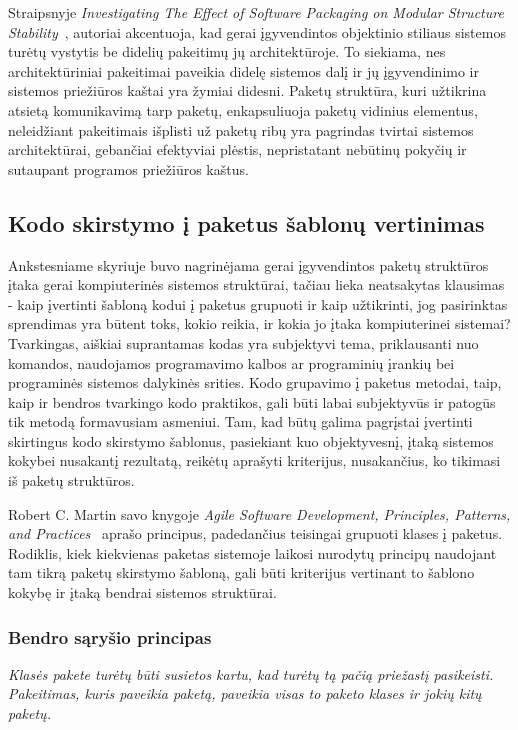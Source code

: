 Straipsnyje \textit{Investigating The Effect of Software Packaging on Modular Structure Stability}~\cite{ModularStability}, autoriai akcentuoja, kad
gerai įgyvendintos objektinio stiliaus sistemos turėtų vystytis be didelių pakeitimų jų architektūroje.
To siekiama, nes architektūriniai pakeitimai paveikia didelę sistemos dalį ir
jų įgyvendinimo ir sistemos priežiūros kaštai yra žymiai didesni\cite{ModularStability}.
Paketų struktūra, kuri užtikrina atsietą  komunikavimą tarp paketų, enkapsuliuoja paketų vidinius elementus, neleidžiant pakeitimais
išplisti už paketų ribų yra pagrindas tvirtai sistemos architektūrai, gebančiai efektyviai plėstis, nepristatant nebūtinų pokyčių ir sutaupant programos priežiūros kaštus.

\subsection{Kodo skirstymo į paketus šablonų vertinimas}
Ankstesniame skyriuje buvo nagrinėjama gerai įgyvendintos paketų struktūros įtaka gerai kompiuterinės sistemos struktūrai,
tačiau lieka neatsakytas klausimas - kaip įvertinti šabloną kodui į paketus grupuoti ir kaip užtikrinti,
jog pasirinktas sprendimas yra būtent toks, kokio reikia, ir kokia jo įtaka kompiuterinei sistemai?
Tvarkingas, aiškiai suprantamas kodas yra subjektyvi tema, priklausanti nuo komandos,
naudojamos programavimo kalbos ar programinių įrankių bei programinės sistemos dalykinės srities.
Kodo grupavimo į paketus metodai, taip, kaip ir bendros tvarkingo kodo praktikos,
gali būti labai subjektyvūs ir patogūs tik metodą formavusiam asmeniui.
Tam, kad būtų galima pagrįstai įvertinti skirtingus kodo skirstymo šablonus, pasiekiant kuo objektyvesnį,
įtaką sistemos kokybei nusakantį rezultatą, reikėtų aprašyti kriterijus, nusakančius, ko tikimasi iš paketų struktūros.

Robert C. Martin savo knygoje \textit{Agile Software Development, Principles, Patterns, and Practices}~\cite{AgileSoftwareDevelopment} aprašo
principus, padedančius teisingai grupuoti klases į paketus.
Rodiklis, kiek kiekvienas paketas sistemoje laikosi nurodytų principų naudojant tam tikrą paketų skirstymo šabloną, gali
būti kriterijus vertinant to šablono kokybę ir įtaką bendrai sistemos struktūrai.

\subsubsection{Bendro sąryšio principas}
\textit{Klasės pakete turėtų būti susietos kartu, kad turėtų tą pačią priežastį pasikeisti. Pakeitimas,
kuris paveikia paketą, paveikia visas to paketo klases ir jokių kitų paketų.}

